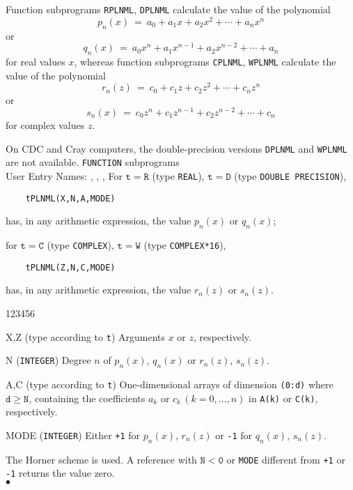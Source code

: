                        
      
\Submitter{}                            
Function subprograms {\tt RPLNML}, {\tt DPLNML} calculate the value
of the polynomial
$$p_n(x) \ = \ a_0+a_1x+a_2x^2+\cdots+a_nx^n$$
or
$$q_n(x) \ = \ a_0x^n+a_1x^{n-1}+a_2x^{n-2}+\cdots+a_n$$
for real values $x$, whereas function subprograms {\tt CPLNML},
{\tt WPLNML} calculate the value of the polynomial
$$r_n(z) \ = \ c_0+c_1z+c_2z^2+\cdots+c_nz^n$$
or
$$s_n(x) \ = \ c_0z^n+c_1z^{n-1}+c_2z^{n-2}+\cdots+c_n$$
for complex values $z$.
\par
On CDC and Cray computers, the double-precision versions {\tt DPLNML}
and {\tt WPLNML} are not available.
\Structure
{\tt FUNCTION} subprograms \\
User Entry Names: , , ,
\Usage
For $\mathtt{t=R}$ (type {\tt REAL}), $\mathtt{t=D}$ (type
{\tt DOUBLE PRECISION}),
\begin{verbatim}
    tPLNML(X,N,A,MODE)
\end{verbatim}
has, in any arithmetic expression, the value $p_n(x)$ or $q_n(x)$;
\par
for $\mathtt{t=C}$ (type {\tt COMPLEX}), $\mathtt{t=W}$ (type
{\tt COMPLEX*16}),
\begin{verbatim}
    tPLNML(Z,N,C,MODE)
\end{verbatim}
has, in any arithmetic expression, the value $r_n(z)$ or $s_n(z)$.
\begin{DLtt}{123456}
\item[X,Z] (type according to {\tt t}) Arguments $x$ or $z$,
respectively.
\item[N] ({\tt INTEGER})
Degree $n$ of $p_n(x),\,q_n(x)$ or $r_n(z),\,s_n(z)$.
\item[A,C] (type according to {\tt t}) One-dimensional arrays of
dimension {\tt (0:d)} where $\mathtt{d \ge N}$, containing the
coefficients $a_k$ or $c_k\,(k=0,\ldots,n)$ in {\tt A(k)} or {\tt C(k)},
respectively.
\item[MODE] ({\tt INTEGER}) Either {\tt +1} for $p_n(x),\,r_n(z)$ or
{\tt -1} for $q_n(x),\,s_n(z)$.
\end{DLtt}
\Method
The Horner scheme is used.
\Notes
A reference with $\mathtt{N<0}$ or {\tt MODE} different from
{\tt +1} or {\tt -1} returns the value zero.
\\ $\bullet$
